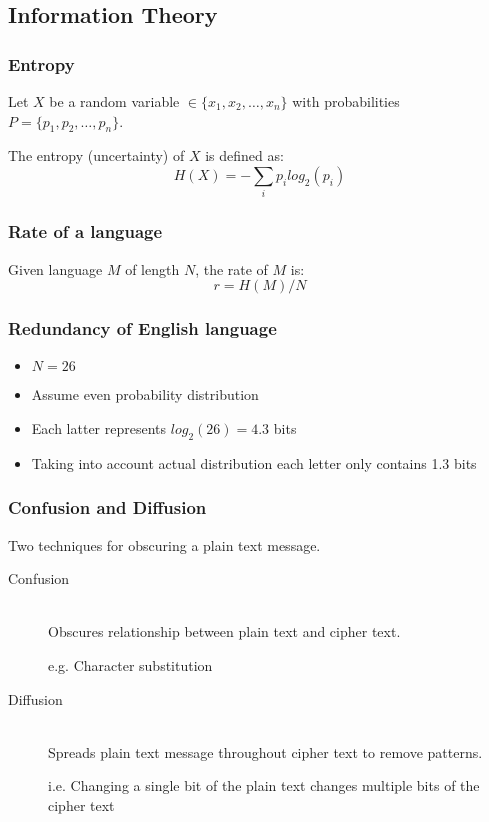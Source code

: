 \documentclass[a4paper]{article}
\begin{document}
\subsection{Information Theory}

\subsubsection{Entropy}

Let $X$ be a random variable $\in \{x_{1}, x_{2}, \ldots,x_{n}\}$ with
probabilities $P = \{p_{1}, p_{2}, \ldots, p_{n}\}$.

The entropy (uncertainty) of $X$ is defined as:
\[
  H(X) = -\sum_{i} p_{i} log_{2}(p_{i})
\]

\subsubsection{Rate of a language}

Given language $M$ of length $N$, the rate of $M$ is:
\[
  r = H(M) / N
\]

\subsubsection{Redundancy of English language}

\begin{itemize}
  \item $N = 26$
  \item Assume even probability distribution
  \item Each latter represents $log_{2}(26) = 4.3$ bits
  \item Taking into account actual distribution each letter only contains 1.3
        bits
\end{itemize}

\subsubsection{Confusion and Diffusion}

Two techniques for obscuring a plain text message.

\begin{description}
  \item[Confusion] \hfill \\
    Obscures relationship between plain text and cipher text.

    e.g. Character substitution

  \item[Diffusion] \hfill \\
    Spreads plain text message throughout cipher text to remove patterns.

    i.e. Changing a single bit of the plain text changes multiple bits of the
    cipher text
\end{description}
\end{document}
